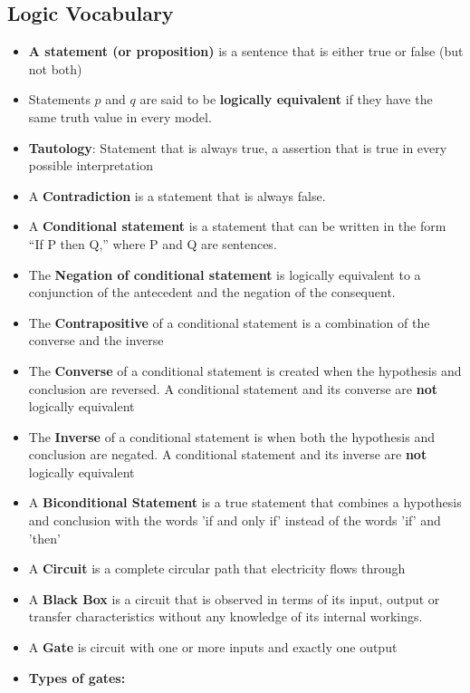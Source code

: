 \documentclass{report}
\begin{document}
    \subsection{Logic Vocabulary}
    \bigbreak \noindent 
    \begin{itemize}
      \item \textbf{A statement (or proposition)} is a sentence that is either true or false (but not both)
      \item Statements $p$ and $q$ are said to be \textbf{logically equivalent} if they have the same truth value in every model.
        \item \textbf{Tautology}: Statement that is always true, a assertion that is true in every possible interpretation
      \item A \textbf{Contradiction} is a statement that is always false.
      \item A \textbf{Conditional statement} is a statement that can be written in the form “If P then Q,” where P and Q are sentences.
      \item The \textbf{Negation of conditional statement} is logically equivalent to a conjunction of the antecedent and the negation of the consequent.
      \item The \textbf{Contrapositive} of a conditional statement is a combination of the converse and the inverse
      \item The \textbf{Converse} of a conditional statement is created when the hypothesis and conclusion are reversed. A conditional statement and its converse are \textbf{not} logically equivalent
      \item  The \textbf{Inverse} of a conditional statement is when both the hypothesis and conclusion are negated. A conditional statement and its inverse are \textbf{not} logically equivalent
      \item A \textbf{Biconditional Statement} is a true statement that combines a hypothesis and conclusion with the words 'if and only if' instead of the words 'if' and 'then'
      \item A \textbf{Circuit} is a complete circular path that electricity flows through
      \item A \textbf{Black Box} is a circuit that is observed in terms of its input, output or transfer characteristics without any knowledge of its internal workings.
      \item A \textbf{Gate} is circuit with one or more inputs and exactly one output
      \item \textbf{Types of gates:}

\end{itemize}
\end{document}
